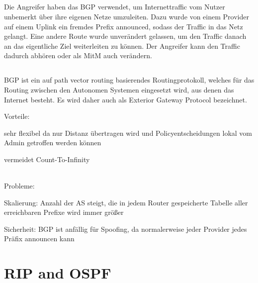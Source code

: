 \documentclass[a4paper,
			llpt,
			solution,
			accentcolor=tud2d,
			colorbacktitle
			]
			{tudexercise}
\newcommand{\8}{$\infty$}
\begin{document}
\subsection{}
Die Angreifer haben das BGP verwendet, um Internettraffic vom Nutzer unbemerkt über ihre eigenen Netze umzuleiten. Dazu wurde von einem Provider auf einem Uplink ein fremdes Prefix announced, sodass der Traffic in das Netz gelangt. Eine andere Route wurde unverändert gelassen, um den Traffic danach an das eigentliche Ziel weiterleiten zu können. Der Angreifer kann den Traffic dadurch abhören oder als MitM auch verändern.
\subsection{}
BGP ist ein auf path vector routing basierendes Routingprotokoll, welches für das Routing zwischen den Autonomen Systemen eingesetzt wird, aus denen das Internet besteht. Es wird daher auch als Exterior Gateway Protocol bezeichnet. \\
\begin{multicols}{2}
Vorteile: \begin{compactenum}
\item sehr flexibel da nur Distanz übertragen wird und Policyentscheidungen lokal vom Admin getroffen werden können
\item vermeidet Count-To-Infinity
\end{compactenum}
~\\
\vfill
\columnbreak
Probleme: \begin{compactenum}
\item Skalierung: Anzahl der AS steigt, die in jedem Router gespeicherte Tabelle aller erreichbaren Prefixe wird immer größer
\item Sicherheit: BGP ist anfällig für Spoofing, da normalerweise jeder Provider jedes Präfix announcen  kann
\end{compactenum}
\end{multicols}
\section{RIP and OSPF}
\end{document}
